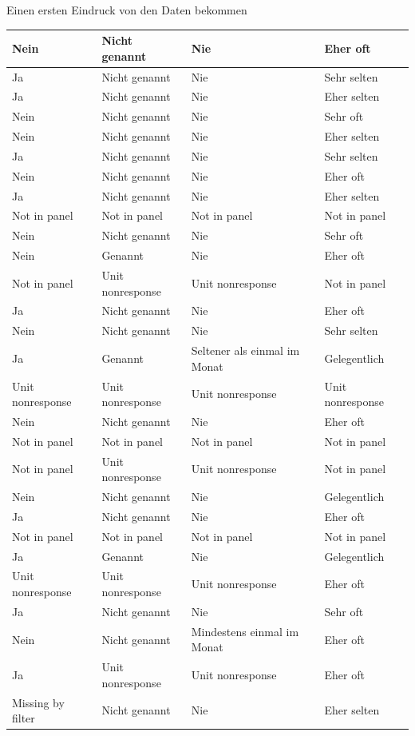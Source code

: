 \documentclass[ignorenonframetext,]{beamer}
\begin{document}
\begin{frame}{Einen ersten Eindruck von den Daten bekommen}
\begin{tabular}{l|l|l|l}
\hline
Nein & Nicht genannt & Nie & Eher oft\\
\hline
Ja & Nicht genannt & Nie & Sehr selten\\
\hline
Ja & Nicht genannt & Nie & Eher selten\\
\hline
Nein & Nicht genannt & Nie & Sehr oft\\
\hline
Nein & Nicht genannt & Nie & Eher selten\\
\hline
Ja & Nicht genannt & Nie & Sehr selten\\
\hline
Nein & Nicht genannt & Nie & Eher oft\\
\hline
Ja & Nicht genannt & Nie & Eher selten\\
\hline
Not in panel & Not in panel & Not in panel & Not in panel\\
\hline
Nein & Nicht genannt & Nie & Sehr oft\\
\hline
Nein & Genannt & Nie & Eher oft\\
\hline
Not in panel & Unit nonresponse & Unit nonresponse & Not in panel\\
\hline
Ja & Nicht genannt & Nie & Eher oft\\
\hline
Nein & Nicht genannt & Nie & Sehr selten\\
\hline
Ja & Genannt & Seltener als einmal im Monat & Gelegentlich\\
\hline
Unit nonresponse & Unit nonresponse & Unit nonresponse & Unit nonresponse\\
\hline
Nein & Nicht genannt & Nie & Eher oft\\
\hline
Not in panel & Not in panel & Not in panel & Not in panel\\
\hline
Not in panel & Unit nonresponse & Unit nonresponse & Not in panel\\
\hline
Nein & Nicht genannt & Nie & Gelegentlich\\
\hline
Ja & Nicht genannt & Nie & Eher oft\\
\hline
Not in panel & Not in panel & Not in panel & Not in panel\\
\hline
Ja & Genannt & Nie & Gelegentlich\\
\hline
Unit nonresponse & Unit nonresponse & Unit nonresponse & Eher oft\\
\hline
Ja & Nicht genannt & Nie & Sehr oft\\
\hline
Nein & Nicht genannt & Mindestens einmal im Monat & Eher oft\\
\hline
Ja & Unit nonresponse & Unit nonresponse & Eher oft\\
\hline
Missing by filter & Nicht genannt & Nie & Eher selten\\

\end{tabular}
\end{frame}
\end{document}

